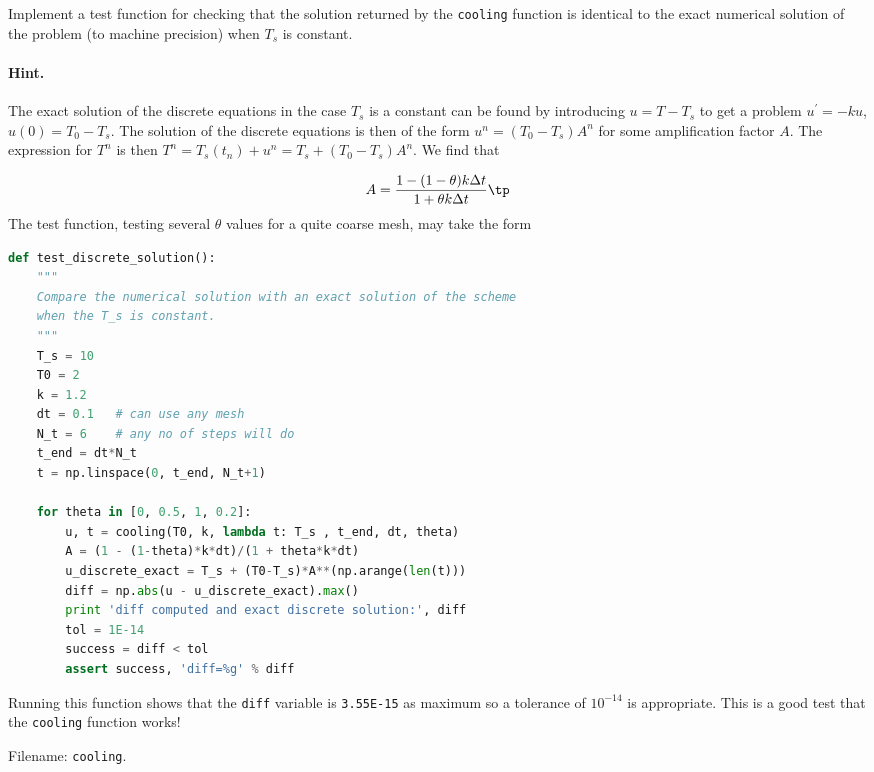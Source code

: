 \documentclass[graybox,sectrefs,envcountresetchap,open=right,final]{svmonodo}
\newenvironment{doconceexercise}{}{}
\begin{document}
\begin{doconceexercise}
Implement a test function for checking that the solution returned by
the \texttt{cooling} function is identical to the exact numerical
solution of the problem (to machine precision) when $T_s$ is constant.


\paragraph{Hint.}
The exact solution of the
discrete equations in the case $T_s$ is a constant can be found by
introducing $u=T-T_s$ to get a problem $u^{\prime}=-ku$, $u(0)=T_0-T_s$.
The solution of the discrete equations is then of the form
$u^{n}=(T_0-T_s)A^n$ for some amplification factor $A$. The
expression for $T^n$ is then $T^n = T_s(t_n) + u^n =
T_s + (T_0-T_s)A^n$.
We find that

\[ A = \frac{1 - (1-\theta) k\Delta t}{1 + \theta k\Delta t}\tp\]
The test function, testing several $\theta$ values for a quite coarse
mesh, may take the form
























\begin{lstlisting}[language=python,style=blue1_bluegreen]
def test_discrete_solution():
    """
    Compare the numerical solution with an exact solution of the scheme
    when the T_s is constant.
    """
    T_s = 10
    T0 = 2
    k = 1.2
    dt = 0.1   # can use any mesh
    N_t = 6    # any no of steps will do
    t_end = dt*N_t
    t = np.linspace(0, t_end, N_t+1)

    for theta in [0, 0.5, 1, 0.2]:
        u, t = cooling(T0, k, lambda t: T_s , t_end, dt, theta)
        A = (1 - (1-theta)*k*dt)/(1 + theta*k*dt)
        u_discrete_exact = T_s + (T0-T_s)*A**(np.arange(len(t)))
        diff = np.abs(u - u_discrete_exact).max()
        print 'diff computed and exact discrete solution:', diff
        tol = 1E-14
        success = diff < tol
        assert success, 'diff=%g' % diff

\end{lstlisting}

Running this function shows that the \texttt{diff} variable is \texttt{3.55E-15}
as maximum so a tolerance of $10^{-14}$ is appropriate.
This is a good test that the \texttt{cooling} function works!



\noindent Filename: \texttt{cooling}.

\end{doconceexercise}
\end{document}
